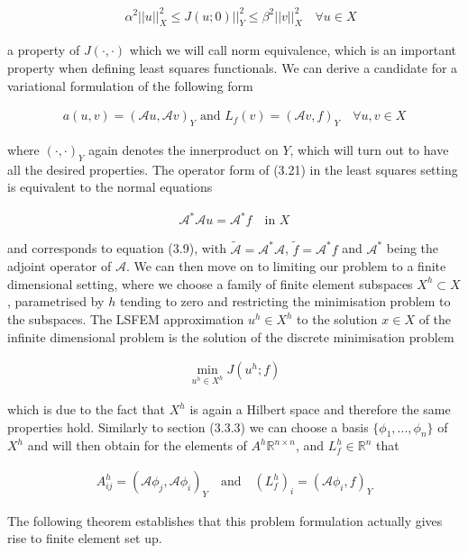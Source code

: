 \documentclass[../draft_1.tex]{subfiles}
\begin{document}
\begin{ceqn}
	\begin{align}
	\quad \alpha^2 || u ||_X^2 \leq J(u; 0)  ||_Y^2 \leq \beta^2 || v ||_X^2 \quad \forall u \in X
	\end{align} 
\end{ceqn}
a property of $J(\cdot, \cdot)$ which we will call norm equivalence, which is an important property when defining least squares functionals. We can derive a candidate for a variational formulation of the following form 
\begin{ceqn}
\begin{align}
a(u,v) = (\mathcal{A}u, \mathcal{A}v)_Y \text{ and } L_f(v) = (\mathcal{A}v, f)_Y \quad \forall u,v \in X
\end{align}
\end{ceqn}
where $(\cdot, \cdot)_Y$ again denotes the innerproduct on $Y$, which will turn out to have all the desired properties. The operator form of (3.21) in the least squares setting is equivalent to the normal equations
\begin{ceqn}
\begin{align}
\mathcal{A}^* \mathcal{A} u = \mathcal{A}^* f \quad \text{in } X
\end{align}
\end{ceqn}
and corresponds to equation (3.9), with $\tilde{\mathcal{A}} = \mathcal{A}^* \mathcal{A}$, $\tilde{f} = \mathcal{A}^* f $ and $\mathcal{A}^*$ being the adjoint operator of $\mathcal{A}$. We can then move on to limiting our problem to a finite dimensional setting, where we choose a family of finite element subspaces $X^h \subset X$, parametrised by $h$ tending to zero and restricting the minimisation problem to the subspaces. The LSFEM approximation $u^h \in X^h$ to the solution $x \in X$ of the infinite dimensional problem is the solution of the discrete minimisation problem 
\begin{ceqn}
\begin{align}
\min_{u^h \in X^h} J(u^h; f)
\end{align}
\end{ceqn}
which is due to the fact that $X^h$ is again a Hilbert space and therefore the same properties hold. Similarly to section (3.3.3) we can choose a basis $\{\phi_1, ..., \phi_n\}$ of $X^h$ and will then obtain for the elements of $A^h \mathbb{R}^{n \times n}$, and $L_f^h \in \mathbb{R}^n$ that

\begin{ceqn}
	\begin{align}
	A_{ij}^h = (\mathcal{A} \phi_j, \mathcal{A} \phi_i)_Y \quad \text{and} \quad (L_f^h)_i = (\mathcal{A} \phi_i, f)_Y
	\end{align}
\end{ceqn}
The following theorem establishes that this problem formulation actually gives rise to finite element set up. 
\end{document}

